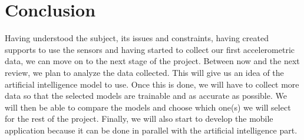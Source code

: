 \section{Conclusion}
Having understood the subject, its issues and constraints, having created supports to use the sensors and having started to collect our first accelerometric data, we can move on to the next stage of the project. Between now and the next review, we plan to analyze the data collected. This will give us an idea of the artificial intelligence model to use. Once this is done, we will have to collect more data so that the selected models are trainable and as accurate as possible. We will then be able to compare the models and choose which one(s) we will select for the rest of the project. Finally, we will also start to develop the mobile application because it can be done in parallel with the artificial intelligence part.